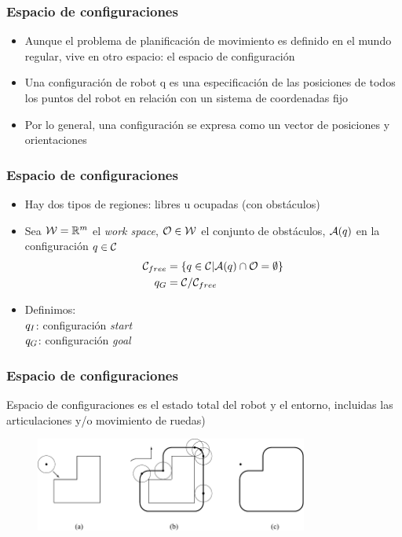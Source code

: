 \begin{frame}
	\frametitle{Espacio de configuraciones}
	
	\begin{itemize}
		\item Aunque el problema de planificación de movimiento es 		definido en el mundo regular, vive en otro espacio: el espacio de configuración
		\item Una configuración de robot q es una especificación de las posiciones de todos los puntos del robot en relación con un sistema de coordenadas fijo
		\item Por lo general, una configuración se expresa como un vector de posiciones y orientaciones
	\end{itemize}

	
\end{frame}

\begin{frame}
	\frametitle{Espacio de configuraciones}
	\begin{itemize}
		\item Hay dos tipos de regiones: libres u ocupadas (con obstáculos)
		\item Sea $\mathcal{W} = \mathbb{R}^{m}$ el \emph{work space}, $\mathcal{O} \in \mathcal{W}$ el conjunto de obstáculos, $\mathcal{A}(q)$ en la configuración $q \in \mathcal{C}$
		\begin{align*}
			 \mathcal{C}_{free} &= \left\lbrace q \in \mathcal{C} | \mathcal{A}(q) \cap \mathcal{O} =  \emptyset \right\rbrace\\
			 q_{G} &= \mathcal{C} / \mathcal{C}_{free}
		\end{align*}
	
		\item Definimos:\\
		$q_{I}$: configuración \emph{start}\\
		$q_{G}$: configuración \emph{goal}
		
	
	\end{itemize}
	
\end{frame}


\begin{frame}
	\frametitle{Espacio de configuraciones}
	
	
	Espacio de configuraciones es el estado total del robot y el entorno, incluidas las articulaciones y/o movimiento de ruedas)
	
	\begin{figure}[!h]
		\includegraphics[width=0.8\textwidth]{images/configuration_space_obstacle.pdf}
	\end{figure}
	
\end{frame}

